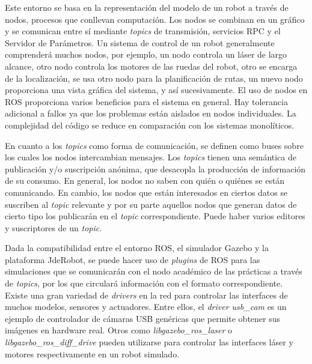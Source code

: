 Este entorno se basa en la representación del modelo de un robot a través de nodos, procesos que conllevan computación. Los nodos se combinan en un gráfico y se comunican entre sí mediante \textit{topics} de transmisión, servicios RPC y el Servidor de Parámetros. Un sistema de control de un robot generalmente comprenderá muchos nodos, por ejemplo, un nodo controla un láser de largo alcance, otro nodo controla los motores de las ruedas del robot, otro se encarga de la localización, se usa otro nodo para la planificación de rutas, un nuevo nodo proporciona una vista gráfica del sistema, y así sucesivamente. El uso de nodos en ROS proporciona varios beneficios para el sistema en general. Hay tolerancia adicional a fallos ya que los problemas están aislados en nodos individuales. La complejidad del código se reduce en comparación con los sistemas monolíticos.

En cuanto a los \textit{topics} como forma de comunicación, se definen como buses sobre los cuales los nodos intercambian mensajes. Los \textit{topics} tienen una semántica de publicación y/o suscripción anónima, que desacopla la producción de información de su consumo. En general, los nodos no saben con quién o quiénes se están comunicando. En cambio, los nodos que están interesados en ciertos datos se suscriben al \textit{topic} relevante y por su parte aquellos nodos que generan datos de cierto tipo los publicarán en el \textit{topic} correspondiente. Puede haber varios editores y suscriptores de un \textit{topic}.

Dada la compatibilidad entre el entorno ROS, el simulador Gazebo y la plataforma JdeRobot, se puede hacer uso de \textit{plugins} de ROS para las simulaciones que se comunicarán con el nodo académico de las prácticas a través de \textit{topics}, por los que circulará información con el formato correspondiente. Existe una gran variedad de \textit{drivers} en la red para controlar las interfaces de muchos modelos, sensores y actuadores. Entre ellos, el \textit{driver usb\_cam} es un ejemplo de controlador de cámaras USB genéricas que permite obtener sus imágenes en hardware real. Otros como \textit{libgazebo\_ros\_laser} o \textit{libgazebo\_ros\_diff\_drive} pueden utilizarse para controlar las interfaces láser y motores respectivamente en un robot simulado.

